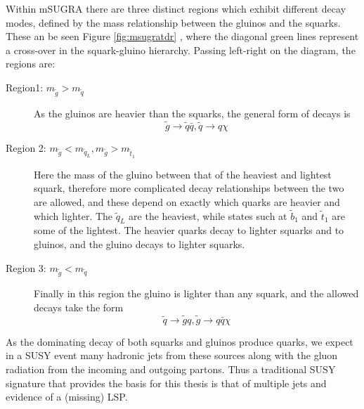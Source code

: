 Within mSUGRA there are three distinct regions which exhibit different decay modes, defined by the mass relationship between the gluinos and the squarks. These an be seen Figure \ref{fig:msugratdr} , where the diagonal green lines represent a cross-over in the squark-gluino hierarchy. Passing left-right on the diagram, the regions are:

\begin{description}
\item[Region1: $m_{\tilde{g}} > m_{\tilde{q}}$]{As the gluinos are heavier than the squarks, the general form of decays is
\begin{equation}
\tilde{g} \rightarrow \tilde{q} \bar{q} , \tilde{q} \rightarrow q \chi
\end{equation}
}
\item[Region 2: $m_{\tilde{g}}< m_{\tilde{q}_{L}}, m_{\tilde{g}}> m_{\tilde{t}_{1}} $]{Here the mass of the gluino between that of the heaviest and lightest squark, therefore more complicated decay relationships between the two are allowed, and these depend on exactly which quarks are heavier and which lighter. The $\tilde{q}_{L}$ are the heaviest, while states such at $\tilde{b}_{1}$ and $\tilde{t}_{1}$ are some of the lightest. The heavier quarks decay to lighter squarks and to gluinos, and the gluino decays to lighter squarks. }
\item[Region 3: $m_{\tilde{g}} < m_{\tilde{q}}$]{Finally in this region the gluino is lighter than any squark, and the allowed decays take the form
\begin{equation}
\tilde{q} \rightarrow \tilde{g}q , \tilde{g} \rightarrow q\bar{q} \chi
\end{equation}
}
\end{description}

As the dominating decay of both squarks and gluinos produce quarks, we expect in a SUSY event many hadronic jets from these sources along with the gluon radiation from the incoming and outgoing partons. Thus a traditional SUSY signature that provides the basis for this thesis is that of multiple jets and evidence of a (missing) LSP. 



